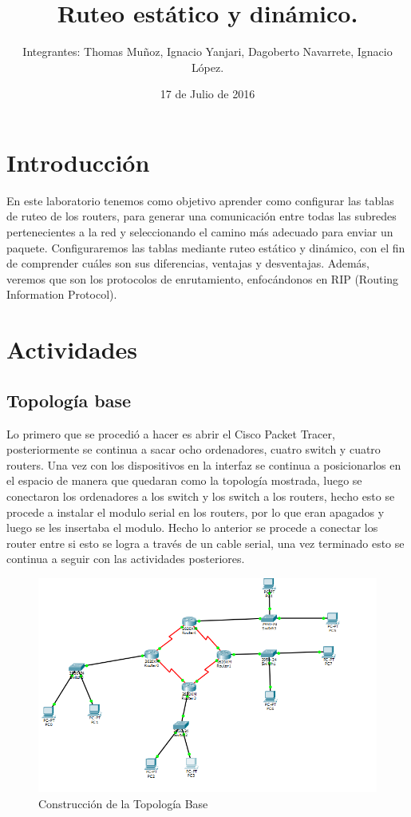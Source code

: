\documentclass{udpreport}
\title{Ruteo estático y dinámico. }
\author{Integrantes: Thomas Muñoz, Ignacio Yanjari, Dagoberto Navarrete, Ignacio López.}
\date{17 de Julio de 2016}
\begin{document}
\maketitle
\tableofcontents
\listoffigures
\chapter{Introducción}
  En este laboratorio tenemos como objetivo aprender como configurar las tablas de ruteo de los routers, para generar una comunicación entre todas las subredes pertenecientes a la red y seleccionando el camino más adecuado para enviar un paquete. Configuraremos las tablas mediante ruteo estático y dinámico, con el fin de
  comprender cuáles son sus diferencias, ventajas y desventajas. Además, veremos que son los protocolos de
  enrutamiento, enfocándonos en RIP (Routing Information Protocol).\\
\chapter{Actividades}
	\section{Topología base}
	Lo primero que se procedió a hacer es abrir el Cisco Packet Tracer, posteriormente se continua a sacar ocho ordenadores,
	cuatro switch y cuatro routers. Una vez con los dispositivos en la interfaz se continua a posicionarlos en el espacio de
	manera que quedaran como la topología mostrada, luego se conectaron los ordenadores a los switch y los switch a los
	routers, hecho esto se procede a instalar el modulo serial en los routers, por lo que eran apagados y luego se les insertaba
	el modulo. Hecho lo anterior se procede a conectar los router entre si esto se logra a través de un cable serial, una vez
	terminado esto se continua a seguir con las actividades posteriores.\\
	\begin{figure}[H]
	\centering
	\includegraphics[width=\textwidth]{Topologia_base.PNG}
	\caption{Construcción de la Topología Base}
	\end{figure}
	\newpage
\end{document}
